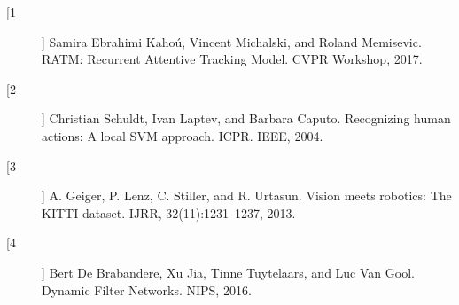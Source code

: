 
\vspace{.5\baselineskip}

{\large
\begin{description}
    \item[[1]] Samira Ebrahimi Kahoú, Vincent Michalski, and Roland Memisevic. RATM: Recurrent Attentive Tracking Model. CVPR Workshop, 2017.
    \item[[2]] Christian Schuldt, Ivan Laptev, and Barbara Caputo. Recognizing human actions: A local SVM approach. ICPR. IEEE, 2004.
    \item[[3]] A. Geiger, P. Lenz, C. Stiller, and R. Urtasun. Vision meets robotics: The KITTI dataset. IJRR,
    32(11):1231–1237, 2013.
    \item [[4]] Bert De Brabandere, Xu Jia, Tinne Tuytelaars, and Luc Van Gool. Dynamic Filter Networks. NIPS, 2016.
\end{description}
}